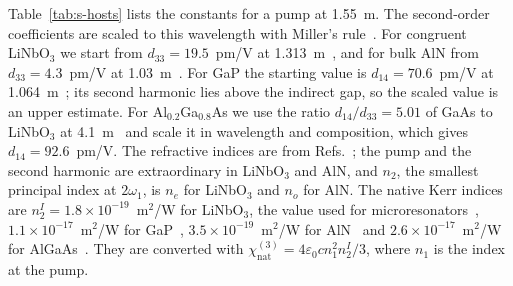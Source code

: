 \documentclass[9pt]{osa-supplemental-document}
\newcommand{\chinat}{\chi^{(3)}_{\mathrm{nat}}}
\begin{document}
Table~\ref{tab:s-hosts} lists the constants for a pump at 1.55~\textmu m.
The second-order coefficients are scaled to this wavelength with Miller's
rule~\cite{miller1964}.  For congruent LiNbO$_3$ we start from $d_{33}=19.5$~pm/V at
1.313~\textmu m~\cite{shoji1997}, and for bulk AlN from $d_{33}=4.3$~pm/V
at 1.03~\textmu m~\cite{majkic2017}.  For GaP the starting value is
$d_{14}=70.6$~pm/V at 1.064~\textmu m~\cite{shoji1997}; its second
harmonic lies above the indirect gap, so the scaled value is an upper
estimate.  For Al$_{0.2}$Ga$_{0.8}$As we use the ratio
$d_{14}/d_{33}=5.01$ of GaAs to LiNbO$_3$ at 4.1~\textmu m~\cite{skauli2002}
and scale it in wavelength and composition, which gives
$d_{14}=92.6$~pm/V.  The refractive indices
are from Refs.~\cite{zelmon1997,bond1965,pastrnak1966,gehrsitz2000}; the
pump and the second harmonic are extraordinary in LiNbO$_3$ and AlN, and
$n_2$, the smallest principal index at $2\omega_1$, is $n_e$ for LiNbO$_3$
and $n_o$ for AlN.  The native Kerr indices are
$n_2^I=1.8\times10^{-19}$~m$^2$/W for LiNbO$_3$, the value used for
microresonators~\cite{kovach2020}, $1.1\times10^{-17}$~m$^2$/W for
GaP~\cite{wilson2020}, $3.5\times10^{-19}$~m$^2$/W for AlN~\cite{liu2018}
and $2.6\times10^{-17}$~m$^2$/W for AlGaAs~\cite{pu2016}.  They are
converted with $\chinat=4\varepsilon_0cn_1^2n_2^I/3$, where $n_1$ is the
index at the pump.
\end{document}
